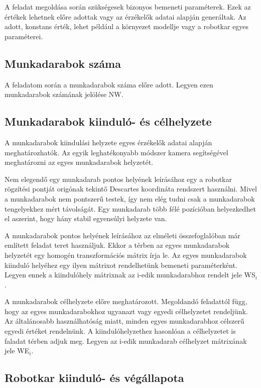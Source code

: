 A feladat megoldása során szükségesek bizonyos bemeneti paraméterek. Ezek az értékek lehetnek előre adottak vagy az érzékelők adatai alapján generáltak. Az adott, konstans érték, lehet például a környezet modellje vagy a robotkar egyes paraméterei.  

\subsection{Munkadarabok száma}

A feladatom során a munkadarabok száma előre adott. Legyen ezen munkadarabok számának jelölése NW.

\subsection{Munkadarabok kiinduló- és célhelyzete}

A munkadarabok kiindulási helyzete egyes érzékelők adatai alapján meghatározhatók. Az egyik leghatékonyabb módszer kamera segítségével meghatározni az egyes munkadarabok helyzetét.

Nem elegendő egy munkadarab pontos helyének leírásához egy a robotkar rögzítési pontját origónak tekintő Descartes koordináta rendszert használni. Mivel a munkadarabok nem pontszerű testek, így nem elég tudni csak a munkadarabok tengelyekhez mért távolságát. Egy munkadarab több félé pozícióban helyezkedhet el aszerint, hogy hány stabil egyensúlyi helyzete van.

A munkadarabok pontos helyének leírásához az elméleti összefoglalóban már említett feladat teret használjuk. Ekkor a térben az egyes munkadarabok helyzetét egy homogén transzformációs mátrix írja le. Az egyes munkadarabok kiinduló helyéhez egy ilyen mátrixot rendelhetünk bemeneti paraméterként. Legyen ennek a kiindulóhely mátrixnak az i-edik munkadarabhoz rendelt jele WS$_i$.

A munkadarabok célhelyzete előre meghatározott. Megoldandó feladattól függ, hogy az egyes munkadarabokhoz ugyanazt vagy egyedi célhelyzetet rendeljünk. Az általánosabb használhatóság miatt, minden egyes munkadarabhoz célszerű egyedi értéket rendelnünk. A kiindulóhelyzethez hasonlóan a célhelyzetet is faladat térben adjuk meg. Legyen az i-edik munkadarab célhelyzet mátrixának jele WE$_i$.


\subsection{Robotkar kiinduló- és végállapota}

